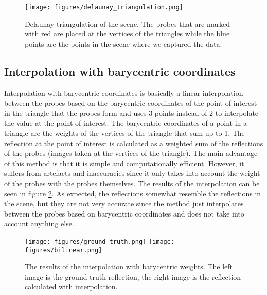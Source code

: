 \begin{figure}[htb]
    \centering
    \texttt{[image: figures/delaunay\_triangulation.png]}
    \caption{Delaunay triangulation of the scene. The probes that are marked with red are placed at the vertices of the triangles while the blue points are the points in the scene where we captured the data.}
    \label{fig:delaunay}
\end{figure}

\subsection{Interpolation with barycentric coordinates}
Interpolation with barycentric coordinates is basically a linear interpolation between the probes based on the barycentric coordinates of the point of interest in the triangle that the probes form and uses 3 points instead of 2 to interpolate the value at the point of interest.
The barycentric coordinates of a point in a triangle are the weights of the vertices of the triangle that sum up to 1.
The reflection at the point of interest is calculated as a weighted sum of the reflections of the probes (images taken at the vertices of the triangle).
The main advantage of this method is that it is simple and computationally efficient. However, it suffers from artefacts and inaccuracies since it only takes into account the weight of the probes with the probes themselves.
The results of the interpolation can be seen in figure \ref{fig:bilinear}. As expected, the reflections somewhat resemble the reflections in the scene, but they are not very accurate since the method just interpolates between the probes based on barycentric coordinates and does not take into account anything else.

\begin{figure}[htb]
    \centering
    \texttt{[image: figures/ground\_truth.png]}
    \texttt{[image: figures/bilinear.png]}

    \caption{The results of the interpolation with barycentric weights. The left image is the ground truth reflection, the right image is the reflection calculated with interpolation.}
    \label{fig:bilinear}
\end{figure}

